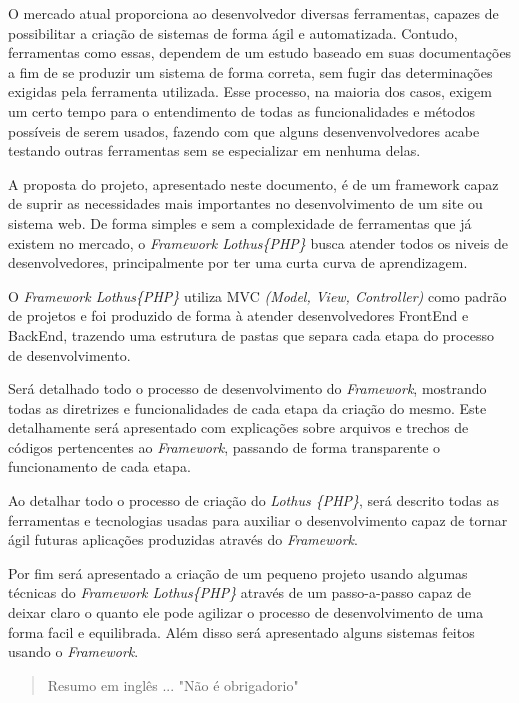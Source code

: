 \documentclass[brazil,ruledheader]{abntifes}
\begin{document}
\begin{resumo}
    O mercado atual proporciona ao desenvolvedor diversas ferramentas, capazes de possibilitar a criação de sistemas de forma ágil e automatizada. Contudo, ferramentas como essas, dependem de um estudo baseado em suas documentações a fim de se produzir um sistema de forma correta, sem fugir das determinações exigidas pela ferramenta utilizada. Esse processo, na maioria dos casos, exigem um certo tempo para o entendimento de todas as funcionalidades e métodos possíveis de serem usados, fazendo com que alguns desenvenvolvedores acabe testando outras ferramentas sem se especializar em nenhuma delas.

    A proposta do projeto, apresentado neste documento, é de um framework capaz de suprir as necessidades mais importantes no desenvolvimento de um site ou sistema web. De forma simples e sem a complexidade de ferramentas que já existem no mercado, o \emph{Framework Lothus\{PHP\}} busca atender todos os niveis de desenvolvedores, principalmente por ter uma curta curva de aprendizagem.

    O \emph{Framework Lothus\{PHP\}} utiliza MVC \emph{(Model, View, Controller)} como padrão de projetos e foi produzido de forma à atender desenvolvedores FrontEnd e BackEnd, trazendo uma estrutura de pastas que separa cada etapa do processo de desenvolvimento.

    Será detalhado todo o processo de desenvolvimento do \emph{Framework}, mostrando todas as diretrizes e funcionalidades de cada etapa da criação do mesmo. Este detalhamente será apresentado com explicações sobre arquivos e trechos de códigos pertencentes ao \emph{Framework}, passando de forma transparente o funcionamento de cada etapa.

    Ao detalhar todo o processo de criação do \emph{Lothus \{PHP\}}, será descrito todas as ferramentas e tecnologias usadas para auxiliar o desenvolvimento capaz de tornar ágil futuras aplicações produzidas através do \emph{Framework}.

    Por fim será apresentado a criação de um pequeno projeto usando algumas técnicas do \emph{Framework Lothus\{PHP\}} através de um passo-a-passo capaz de deixar claro o quanto ele pode agilizar o processo de desenvolvimento de uma forma facil e equilibrada. Além disso será apresentado alguns sistemas feitos usando o \emph{Framework}.
\end{resumo}


\begin{abstract}
Resumo em inglês ... "Não é obrigadorio"
\end{abstract}
\end{document}
